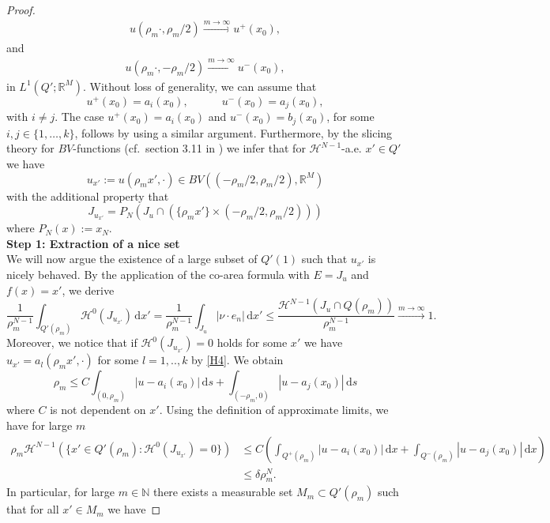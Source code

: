 \documentclass[a4paper, 11pt, reqno]{amsart}
\theoremstyle{plain}
\theoremstyle{definition}
\theoremstyle{remark}
\newcommand{\N}{\mathbb N}
\newcommand{\R}{\mathbb R}
\renewcommand{\H}{\mathcal H}
\begin{document}
\begin{proof}
    \begin{align}\label{eq:conv_1}
        u(\rho_m \cdot , \rho_m/2) \xrightarrow{m \to \infty} u^+(x_0),
    \end{align}   
    and
    \begin{align}\label{eq:conv_2}
        u(\rho_m \cdot, -\rho_m/2) \xrightarrow{m \to \infty} u^-(x_0),
    \end{align}
    in $L^1(Q'; \R^M)$.
    Without loss of generality, we can assume that
    \[
    u^+(x_0)=a_i(x_0),\quad\quad\quad
    u^-(x_0)=a_j(x_0),
    \]
    with $i\neq j$.
    The case $u^+(x_0)=a_i(x_0)$ and $u^-(x_0)=b_j(x_0)$, for some $i,j\in\{1,\dots,k\}$, follows by using a similar argument.
    Furthermore, by the slicing theory for $BV$-functions (cf.\ section 3.11 in \cite{AFP}) we infer that for $\H^{N-1}$-a.e. $x' \in Q'$ we have 
    \[
        u_{x'} := u(\rho_m x', \cdot) \in BV((-\rho_m/2,\rho_m/2), \R^M)
    \]
    with the additional property that 
    $$
        J_{u_{x'}} = P_N(J_u \cap (\{\rho_m x'\} \times (-\rho_m/2,\rho_m/2)))
    $$ where $P_N(x) := x_N$. \\[0.5em]
    \textbf{Step 1: Extraction of a nice set}\\[0.5em]
    We will now argue the existence of a large subset of $Q'(1)$ such that $u_{x'}$ is nicely behaved. By the application of the co-area formula \cite[Theorem 2.93]{AFP} with $E = J_u$ and $f(x) = x'$, we derive
    \[
        \frac{1}{\rho_m^{N-1}} \int_{Q'(\rho_m)} \H^0(J_{u_{x'}}) \, \mathrm{d}x' = \frac{1}{\rho_m^{N-1}} \int_{J_u} |\nu \cdot e_n| \, \mathrm{d}x' \leq \frac{\H^{N-1}(J_u \cap Q(\rho_m))}{\rho_m^{N-1}} \xrightarrow{m \to \infty} 1.
    \]
    Moreover, we notice that if $\H^0(J_{u_{x'}}) = 0$ holds for some $x'$ we have $u_{x'} = a_l(\rho_m x', \cdot)$ for some $l=1,..,k$ by \ref{H4}. We obtain
    \[
        \rho_m \leq C\int_{(0, \rho_m)}| u - a_i(x_0)|\, \mathrm{d}s + \int_{(-\rho_m, 0)}| u - a_j(x_0)|\, \mathrm{d}s
    \]
    where $C$ is not dependent on $x'$. Using the definition of approximate limits, we have for large $m$ 
    \begin{align*}
        \rho_m\H^{N-1}(\{x' \in Q'(\rho_m) : \H^0(J_{u_{x'}}) = 0 \}) & \leq C\left( \int_{Q^+(\rho_m)}| u - a_i(x_0)|\, \mathrm{d}x + \int_{Q^-(\rho_m)}| u - a_j(x_0)|\, \mathrm{d}x \right) \\
        &\leq \delta \rho_m^{N}.
    \end{align*}
    In particular, for large $m \in \N$ there exists a measurable set $M_m \subset Q'(\rho_m)$ such that for all $x' \in M_m$ we have 

\end{proof}
\end{document}
